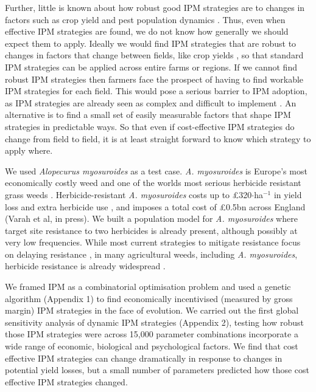 \documentclass[9pt,twocolumn,twoside,lineno]{pnas-new}
\begin{document}
Further, little is known about how robust good IPM strategies are to changes in factors such as crop yield and pest population dynamics \citep{EpanN2010}. Thus, even when effective IPM strategies are found, we do not know how generally we should expect them to apply. Ideally we would find IPM strategies that are robust to changes in factors that change between fields, like crop yields \citep{Swin1994, Hick2018}, so that standard IPM strategies can be applied across entire farms or regions. If we cannot find robust IPM strategies then farmers face the prospect of having to find workable IPM strategies for each field. This would pose a serious barrier to IPM adoption, as IPM strategies are already seen as complex and difficult to implement \citep{Llew2006}. An alternative is to find a small set of easily measurable factors that shape IPM strategies in predictable ways. So that even if cost-effective IPM strategies do change from field to field, it is at least straight forward to know which strategy to apply where.     

We used \textit{Alopecurus myosuroides} as a test case. \textit{A. myosuroides} is Europe's most economically costly weed \citep{Moss2007} and one of the worlds most serious herbicide resistant grass weeds \citep{Heap2014}. Herbicide-resistant \textit{A. myosuroides} costs up to \pounds 320$\cdot$ha$^{-1}$ in yield loss and extra herbicide use \citep{Hick2018}, and imposes a total cost of \pounds 0.5bn across England (Varah et al, in press). We built a population model for \textit{A. myosuroides} where target site resistance to two herbicides is already present, although possibly at very low frequencies. While most current strategies to mitigate resistance focus on delaying resistance \citep{REX2013}, in many agricultural weeds, including \textit{A. myosuroides}, herbicide resistance is already widespread \citep{Hick2018}.            

We framed IPM as a combinatorial optimisation problem and used a genetic algorithm (Appendix 1) to find economically incentivised (measured by gross margin) IPM strategies \citep{Tayl2004GA, Carr2010} in the face of evolution. We carried out the first global sensitivity analysis of dynamic IPM strategies (Appendix 2), testing how robust those IPM strategies were across 15,000 parameter combinations incorporate a wide range of economic, biological and psychological factors. We find that cost effective IPM strategies can change dramatically in response to changes in potential yield losses, but a small number of parameters predicted how those cost effective IPM strategies changed. 
\end{document}
